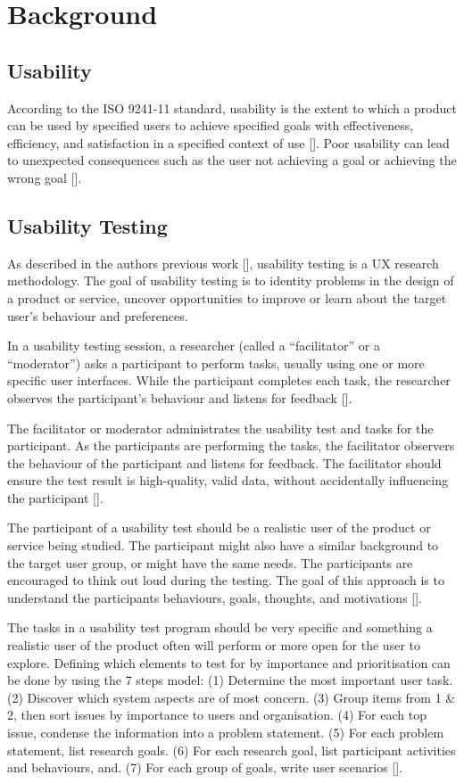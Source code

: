\section{Background}

\subsection{Usability}
According to the ISO 9241-11 standard, usability is the extent to which a product can be used by specified users to achieve specified goals with effectiveness, efficiency, and satisfaction in a specified context of use [\cite{iso_2022}]. Poor usability can lead to unexpected consequences such as the user not achieving a goal or achieving the wrong goal [\cite{iso_2022}].

\subsection{Usability Testing}
As described in the authors previous work [\cite{ano_2021}], usability testing is a UX research methodology. The goal of usability testing is to identity problems in the design of a product or service, uncover opportunities to improve or learn about the target user’s behaviour and preferences.

In a usability testing session, a researcher (called a “facilitator” or a “moderator”) asks a participant to perform tasks, usually using one or more specific user interfaces. While the participant completes each task, the researcher observes the participant’s behaviour and listens for feedback [\cite{ano_2021}].

The facilitator or moderator administrates the usability test and tasks for the participant. As the participants are performing the tasks, the facilitator observers the behaviour of the participant and listens for feedback. The facilitator should ensure the test result is high-quality, valid data, without accidentally influencing the participant [\cite{ano_2021}].

The participant of a usability test should be a realistic user of the product or service being studied. The participant might also have a similar background to the target user group, or might have the same needs. The participants are encouraged to think out loud during the testing. The goal of this approach is to understand the participants behaviours, goals, thoughts, and motivations [\cite{ano_2021}].

The tasks in a usability test program should be very specific and something a realistic user of the product often will perform or more open for the user to explore. Defining which elements to test for by importance and prioritisation can be done by using the 7 steps model: (1) Determine the most important user task. (2) Discover which system aspects are of most concern. (3) Group items from 1 \& 2, then sort issues by importance to users and organisation. (4) For each top issue, condense the information into a problem statement. (5) For each problem statement, list research goals. (6) For each research goal, list participant activities and behaviours, and. (7) For each group of goals, write user scenarios [\cite{ano_2021}].  

